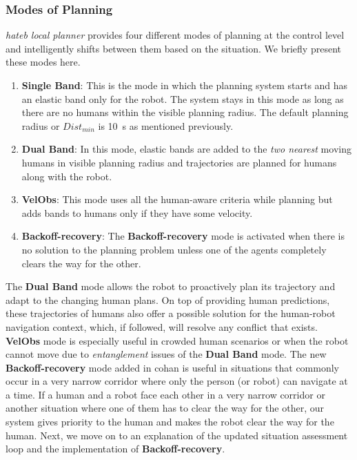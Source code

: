 \subsubsection{Modes of Planning}
\textit{\acrshort{hateb} local planner} provides four different modes of planning at the control level and intelligently shifts between them based on the situation. We briefly present these modes here.
\begin{enumerate}
    \item \textbf{{Single Band}}: This is the mode in which the planning system starts and has an elastic band only for the robot. The system stays in this mode as long as there are no humans within the visible planning radius. The default planning radius or $Dist_{min}$ is \SI{10}{\second} as mentioned previously. 
    \item \textbf{{Dual Band}}: In this mode, elastic bands are added to the \textit{two nearest} moving humans in visible planning radius and trajectories are planned for humans along with the robot. 
    \item \textbf{{VelObs}}: This mode uses all the human-aware criteria while planning but adds bands to humans only if they have some velocity.
    \item \textbf{{Backoff-recovery}}: The \textbf{Backoff-recovery} mode is activated when there is no solution to the planning problem unless one of the agents completely clears the way for the other.
\end{enumerate}

The \textbf{Dual Band} mode allows the robot to proactively plan its trajectory and adapt to the changing human plans. On top of providing human predictions, these trajectories of humans also offer a possible solution for the human-robot navigation context, which, if followed, will resolve any conflict that exists. \textbf{VelObs} mode is especially useful in crowded human scenarios or when the robot cannot move due to \textit{entanglement} issues of the \textbf{{Dual Band}} mode. The new \textbf{Backoff-recovery} mode added in \acrshort{cohan} is useful in situations that commonly occur in a very narrow corridor where only the person (or robot) can navigate at a time. If a human and a robot face each other in a very narrow corridor or another situation where one of them has to clear the way for the other, our system gives priority to the human and makes the robot clear the way for the human. Next, we move on to an explanation of the updated situation assessment loop and the implementation of \textbf{Backoff-recovery}.

